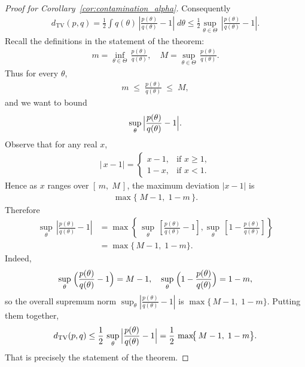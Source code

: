\documentclass[12pt]{article}
\begin{document}
\begin{proof}[Proof for Corollary~\ref{cor:contamination_alpha}]
    Consequently
    \begin{align*}
        d_{\mathrm{TV}}(p,q) = \frac{1}{2}\int q(\theta)\,\left|
    \frac{p(\theta)}{q(\theta)}-1 \right|\;d\theta \leq \frac{1}{2}\sup_{\theta\in\Theta}\,\left|\frac{p(\theta)}{q(\theta)}-1\right|.
    \end{align*}
    Recall the definitions in the statement of the theorem:
    \begin{align*}
        m = \inf_{\theta\in\Theta}\,\frac{p(\theta)}{q(\theta)}, \quad M = \sup_{\theta\in\Theta}\,\frac{p(\theta)}{q(\theta)}.
    \end{align*}
    Thus for every $\theta$,
    \begin{align*}
        m \;\le\; \frac{p(\theta)}{q(\theta)} \;\le\; M,
    \end{align*}
    and we want to bound
    \begin{align*}
        \sup_{\theta}\,\Bigl|\frac{p(\theta)}{q(\theta)}-1\Bigr|.
    \end{align*}
    Observe that for any real $x$,
    \begin{align*}
        \bigl|\,x-1\bigr| = 
       \begin{cases}
         x-1, &\text{if } x\ge1,\\
         1-x, &\text{if } x<1.
       \end{cases}
    \end{align*}
    Hence as $x$ ranges over $[\,m,\;M\,]$, the maximum deviation $|x-1|$ is
    \begin{align*}
        \max\!\bigl\{\;M-1,\;1-m\,\bigr\}.
    \end{align*}
    Therefore
    \begin{align*}
        \sup_{\theta}\,\left|\frac{p(\theta)}{q(\theta)} -1\right| &= \max\left\{\, \sup_\theta\,\left[\frac{p(\theta)}{q(\theta)} -1\right], \sup_\theta\,\left[1 - \frac{p(\theta)}{q(\theta)}\right]\right\} \\
        &= \max\!\bigl\{\,M -1,\;1 - m\bigr\}.
    \end{align*}
    Indeed,
    \begin{align*}
        \sup_\theta\;\Bigl(\frac{p(\theta)}{q(\theta)}-1\Bigr) = M-1,\quad \sup_\theta\;\Bigl(1-\frac{p(\theta)}{q(\theta)}\Bigr) = 1-m,
    \end{align*}
    so the overall supremum norm $\sup_\theta|\frac{p(\theta)}{q(\theta)}-1|$ is $\max\{\,M-1,\;1-m\}$.
    Putting them together,
    \begin{align*}
        d_{\mathrm{TV}}(p,q) \leq \frac12\,\sup_{\theta}\,\Bigl|\frac{p(\theta)}{q(\theta)}-1\Bigr| = \frac12\,\max\!\bigl\{\,M-1,\;1-m\bigr\}.
    \end{align*}
    That is precisely the statement of the theorem.
\end{proof}
\end{document}
